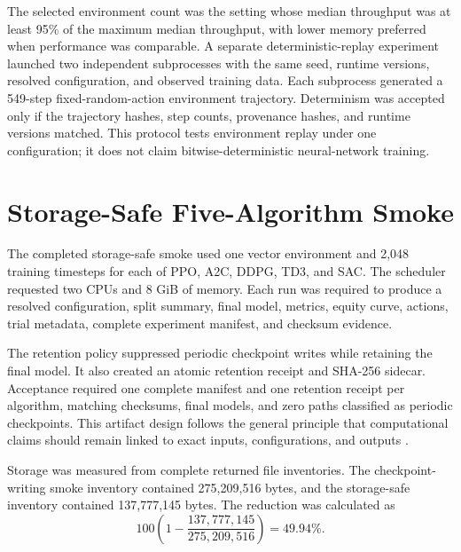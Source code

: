 \documentclass[12pt,a4paper,oneside]{book}
\begin{document}
The selected environment count was the setting whose median throughput was at least 95\% of the maximum median throughput, with lower memory preferred when performance was comparable. A separate deterministic-replay experiment launched two independent subprocesses with the same seed, runtime versions, resolved configuration, and observed training data. Each subprocess generated a 549-step fixed-random-action environment trajectory. Determinism was accepted only if the trajectory hashes, step counts, provenance hashes, and runtime versions matched. This protocol tests environment replay under one configuration; it does not claim bitwise-deterministic neural-network training.

\section{Storage-Safe Five-Algorithm Smoke}

The completed storage-safe smoke used one vector environment and 2,048 training timesteps for each of PPO, A2C, DDPG, TD3, and SAC. The scheduler requested two CPUs and 8 GiB of memory. Each run was required to produce a resolved configuration, split summary, final model, metrics, equity curve, actions, trial metadata, complete experiment manifest, and checksum evidence.

The retention policy suppressed periodic checkpoint writes while retaining the final model. It also created an atomic retention receipt and SHA-256 sidecar. Acceptance required one complete manifest and one retention receipt per algorithm, matching checksums, final models, and zero paths classified as periodic checkpoints. This artifact design follows the general principle that computational claims should remain linked to exact inputs, configurations, and outputs \cite{sandve2013reproducible,henderson2018drl}.

Storage was measured from complete returned file inventories. The checkpoint-writing smoke inventory contained 275,209,516 bytes, and the storage-safe inventory contained 137,777,145 bytes. The reduction was calculated as
\begin{equation}
  100\left(1-\frac{137{,}777{,}145}{275{,}209{,}516}\right)=49.94\%.
  \label{eq:storage-reduction}
\end{equation}

\FloatBarrier


\end{document}
